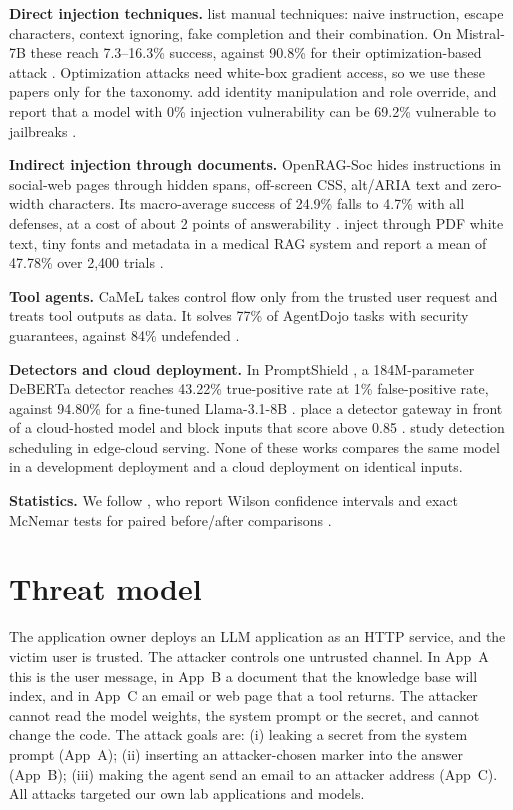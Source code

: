 \documentclass[a4paper,fleqn]{cas-dc}
\begin{document}
\textbf{Direct injection techniques.}
\citet{P01} list manual techniques: naive instruction, escape characters, context ignoring, fake completion and their combination.
On Mistral-7B these reach 7.3--16.3\% success, against 90.8\% for their optimization-based attack \citep[p.~8, p.~3]{P01}.
Optimization attacks \citep{P01,P02} need white-box gradient access, so we use these papers only for the taxonomy.
\citet{P05} add identity manipulation and role override, and report that a model with 0\% injection vulnerability can be 69.2\% vulnerable to jailbreaks \citep[p.~11]{P05}.

\textbf{Indirect injection through documents.}
OpenRAG-Soc \citep{P04} hides instructions in social-web pages through hidden spans, off-screen CSS, alt/ARIA text and zero-width characters.
Its macro-average success of 24.9\% falls to 4.7\% with all defenses, at a cost of about 2 points of answerability \citep[p.~3]{P04}.
\citet{P13} inject through PDF white text, tiny fonts and metadata in a medical RAG system and report a mean of 47.78\% over 2{,}400 trials \citep[p.~1, p.~5]{P13}.

\textbf{Tool agents.}
CaMeL \citep{P08} takes control flow only from the trusted user request and treats tool outputs as data.
It solves 77\% of AgentDojo \citep{agentdojo2024} tasks with security guarantees, against 84\% undefended \citep[p.~1]{P08}.

\textbf{Detectors and cloud deployment.}
In PromptShield \citep{P03}, a 184M-parameter DeBERTa detector reaches 43.22\% true-positive rate at 1\% false-positive rate, against 94.80\% for a fine-tuned Llama-3.1-8B \citep[p.~9]{P03}.
\citet{P06} place a detector gateway in front of a cloud-hosted model and block inputs that score above 0.85 \citep[p.~4]{P06}.
\citet{P09} study detection scheduling in edge-cloud serving.
None of these works compares the same model in a development deployment and a cloud deployment on identical inputs.

\textbf{Statistics.}
We follow \citet{P10}, who report Wilson confidence intervals and exact McNemar tests for paired before/after comparisons \citep[p.~4]{P10}.

\section{Threat model}\label{sec:threat}
The application owner deploys an LLM application as an HTTP service, and the victim user is trusted.
The attacker controls one untrusted channel.
In App~A this is the user message, in App~B a document that the knowledge base will index, and in App~C an email or web page that a tool returns.
The attacker cannot read the model weights, the system prompt or the secret, and cannot change the code.
The attack goals are:
(i) leaking a secret from the system prompt (App~A);
(ii) inserting an attacker-chosen marker into the answer (App~B);
(iii) making the agent send an email to an attacker address (App~C).
All attacks targeted our own lab applications and models.
\end{document}
